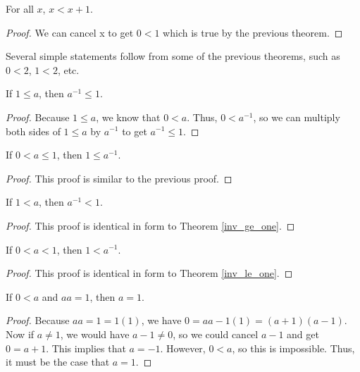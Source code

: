 \documentclass[../../math.tex]{subfiles}
\begin{document}
\begin{theorem}
    For all $x$, $x < x + 1$.
\end{theorem}
\begin{proof}
    We can cancel x to get $0 < 1$ which is true by the previous theorem.
\end{proof}

Several simple statements follow from some of the previous theorems, such as $0
< 2$, $1 < 2$, etc.

\begin{theorem} \label{inv_ge_one}
    If $1 \leq a$, then $a^{-1} \leq 1$.
\end{theorem}
\begin{proof}
    Because $1 \leq a$, we know that $0 < a$.  Thus, $0 < a^{-1}$, so we can
    multiply both sides of $1 \leq a$ by $a^{-1}$ to get $a^{-1} \leq 1$.
\end{proof}

\begin{theorem} \label{inv_le_one}
    If $0 < a \leq 1$, then $1 \leq a^{-1}$.
\end{theorem}
\begin{proof}
    This proof is similar to the previous proof.
\end{proof}

\begin{theorem}
    If $1 < a$, then $a^{-1} < 1$.
\end{theorem}
\begin{proof}
    This proof is identical in form to Theorem \ref{inv_ge_one}.
\end{proof}

\begin{theorem}
    If $0 < a < 1$, then $1 < a^{-1}$.
\end{theorem}
\begin{proof}
    This proof is identical in form to Theorem \ref{inv_le_one}.
\end{proof}

\begin{theorem}
    If $0 < a$ and $aa = 1$, then $a = 1$.
\end{theorem}
\begin{proof}
    Because $aa = 1 = 1(1)$, we have $0 = aa - 1(1) = (a + 1)(a - 1)$.  Now if
    $a \neq 1$, we would have $a - 1 \neq 0$, so we could cancel $a - 1$ and get
    $0 = a + 1$.  This implies that $a = -1$.  However, $0 < a$, so this is
    impossible.  Thus, it must be the case that $a = 1$.
\end{proof}
\end{document}
